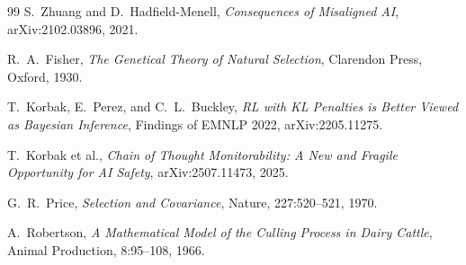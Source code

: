 \documentclass[11pt,a4paper]{article}
\begin{document}
\begin{thebibliography}{99}
S.~Zhuang and D.~Hadfield-Menell,
\emph{Consequences of Misaligned AI},
arXiv:2102.03896, 2021.

R.~A.~Fisher,
\emph{The Genetical Theory of Natural Selection},
Clarendon Press, Oxford, 1930.

T.~Korbak, E.~Perez, and C.~L.~Buckley,
\emph{RL with KL Penalties is Better Viewed as Bayesian Inference},
Findings of EMNLP 2022, arXiv:2205.11275.

T.~Korbak et al.,
\emph{Chain of Thought Monitorability: A New and Fragile Opportunity for AI Safety},
arXiv:2507.11473, 2025.

G.~R.~Price,
\emph{Selection and Covariance},
Nature, 227:520--521, 1970.

A.~Robertson,
\emph{A Mathematical Model of the Culling Process in Dairy Cattle},
Animal Production, 8:95--108, 1966.

\end{thebibliography}
\end{document}
